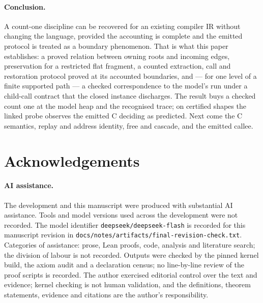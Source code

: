 \documentclass[a4paper,UKenglish,cleveref]{lipics-v2021}
\begin{document}
\paragraph*{Conclusion.}
A count-one discipline can be recovered for an existing compiler IR without
changing the language, provided the accounting is complete and the emitted protocol
is treated as a boundary phenomenon.
That is what this paper establishes: a proved relation between owning roots and
incoming edges, preservation for a restricted flat fragment, a counted extraction,
call and restoration protocol proved at its accounted boundaries, and --- for one
level of a finite supported path --- a checked correspondence to the model's run
under a child-call contract that the closed instance discharges. The result buys a checked count one at the model heap and the
recognised trace; on certified shapes the linked probe observes the emitted C
deciding as predicted. Next come the C semantics, replay and
address identity, free and cascade, and the emitted callee.

\section*{Acknowledgements}
\paragraph*{AI assistance.}
The development and this manuscript were produced with substantial AI assistance.
Tools and model versions used across the development were not recorded. The model
identifier \texttt{deepseek/deepseek-flash} is recorded for this manuscript revision
in \texttt{docs/notes/artifacts/final-revision-check.txt}. Categories of assistance:
prose, Lean proofs, code, analysis and literature search; the division of labour is
not recorded. Outputs were checked by the pinned kernel build, the axiom audit and a
declaration census; no line-by-line review of the proof scripts is recorded. The
author exercised editorial control over the text and evidence; kernel checking is not
human validation, and the definitions, theorem statements, evidence and citations are
the author's responsibility.



\end{document}
